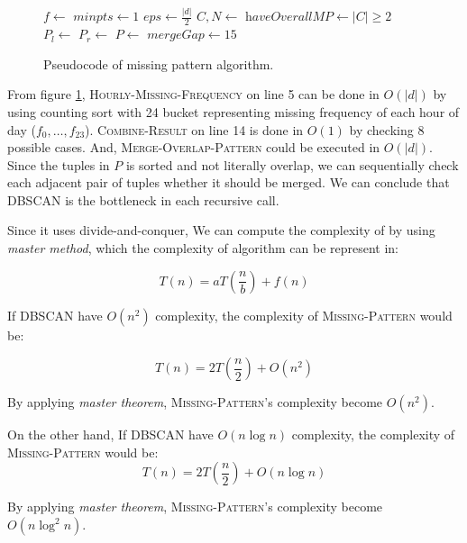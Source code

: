 \documentclass[conference]{IEEEtran}
\begin{document}
\begin{figure}[H]
\begin{algorithmic}[1]
\State\Return{$\emptyset$}
\EndIf
\State $f \gets$ 
\State $minpts \gets 1$
\State $eps \gets \frac{|d|}{2}$
\State $C, N \gets$ 
\State
\State $\textit{haveOverallMP} \gets |C| \ge 2$
\State
\State $P_{l} \gets$ 
\State $P_{r} \gets$ 
\State $P \gets$ 
\State
\State $\textit{mergeGap} \gets 15$ 
\State {}
\EndProcedure
\end{algorithmic}
\caption{Pseudocode of missing pattern algorithm.}
\label{fig:missingpattern_pseudocode}
\end{figure}

From figure \ref{fig:missingpattern_pseudocode}, \textsc{Hourly-Missing-Frequency} on line 5 can be done in $O(|d|)$ by using counting sort with 24 bucket representing missing frequency of each hour of day ($f_{0},\ldots,f_{23}$). \textsc{Combine-Result} on line 14 is done in $O(1)$ by checking 8 possible cases. And, \textsc{Merge-Overlap-Pattern} could be executed in $O(|d|)$. Since the tuples in $P$ is sorted and not literally overlap, we can sequentially check each adjacent pair of tuples whether it should be merged. We can conclude that \textsc{DBSCAN} is the bottleneck in each recursive call.

Since it uses divide-and-conquer, We can compute the complexity of by using \textit{master method}, which the complexity of algorithm can be represent in:

\[
T(n) = aT(\frac{n}{b}) + f(n)
\]

If \textsc{DBSCAN} have $O(n^2)$ complexity, the complexity of \textsc{Missing-Pattern} would be:

\[
T(n) = 2T(\frac{n}{2}) + O(n^2)
\]

By applying \textit{master theorem}, \textsc{Missing-Pattern}'s complexity become $O(n^2)$.

On the other hand, If \textsc{DBSCAN} have $O(n \log{n})$ complexity, the complexity of \textsc{Missing-Pattern} would be:
\[
T(n) = 2T(\frac{n}{2}) + O(n \log{n})
\]

By applying \textit{master theorem}, \textsc{Missing-Pattern}'s complexity become $O(n \log^2{n})$.
\end{document}
